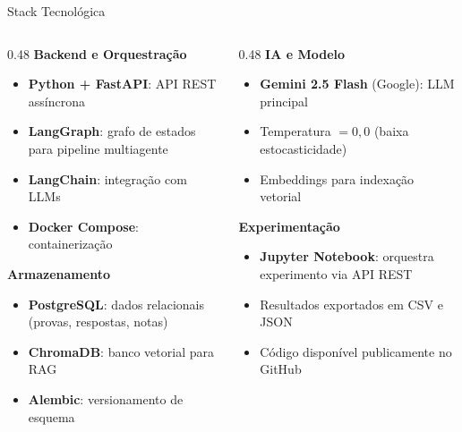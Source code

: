 \documentclass[10pt,aspectratio=169]{beamer}
\begin{document}
\begin{frame}{Stack Tecnológica}
  \begin{columns}[T]
    \begin{column}{0.48\textwidth}
      \textbf{Backend e Orquestração}
      \begin{itemize}
        \item \textbf{Python + FastAPI}: API REST assíncrona
        \item \textbf{LangGraph}: grafo de estados para pipeline multiagente
        \item \textbf{LangChain}: integração com LLMs
        \item \textbf{Docker Compose}: containerização
      \end{itemize}
      \vspace{0.4em}
      \textbf{Armazenamento}
      \begin{itemize}
        \item \textbf{PostgreSQL}: dados relacionais (provas, respostas, notas)
        \item \textbf{ChromaDB}: banco vetorial para RAG
        \item \textbf{Alembic}: versionamento de esquema
      \end{itemize}
    \end{column}
    \begin{column}{0.48\textwidth}
      \textbf{IA e Modelo}
      \begin{itemize}
        \item \textbf{Gemini 2.5 Flash} (Google): LLM principal
        \item Temperatura $= 0{,}0$ (baixa estocasticidade)
        \item Embeddings para indexação vetorial
      \end{itemize}
      \vspace{0.4em}
      \textbf{Experimentação}
      \begin{itemize}
        \item \textbf{Jupyter Notebook}: orquestra experimento via API REST
        \item Resultados exportados em CSV e JSON
        \item Código disponível publicamente no GitHub
      \end{itemize}
    \end{column}
  \end{columns}
\end{frame}

\end{document}
